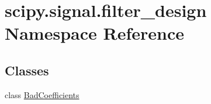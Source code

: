 \hypertarget{namespacescipy_1_1signal_1_1filter__design}{}\section{scipy.\+signal.\+filter\+\_\+design Namespace Reference}
\label{namespacescipy_1_1signal_1_1filter__design}
\subsection*{Classes}
\begin{DoxyCompactItemize}
\item 
class \hyperlink{classscipy_1_1signal_1_1filter__design_1_1BadCoefficients}{Bad\+Coefficients}
\end{DoxyCompactItemize}

